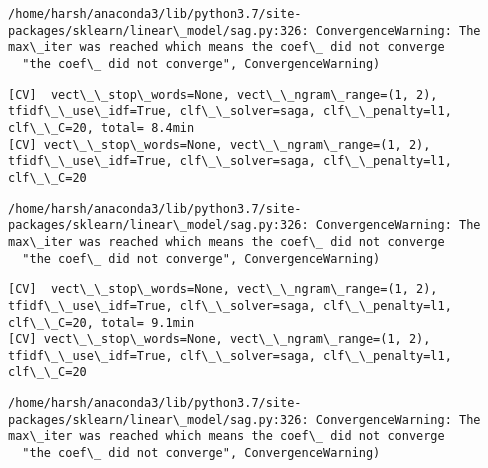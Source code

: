 \documentclass[11pt]{article}
\begin{document}
    \begin{Verbatim}[commandchars=\\\{\}]
/home/harsh/anaconda3/lib/python3.7/site-packages/sklearn/linear\_model/sag.py:326: ConvergenceWarning: The max\_iter was reached which means the coef\_ did not converge
  "the coef\_ did not converge", ConvergenceWarning)

    \end{Verbatim}

    \begin{Verbatim}[commandchars=\\\{\}]
[CV]  vect\_\_stop\_words=None, vect\_\_ngram\_range=(1, 2), tfidf\_\_use\_idf=True, clf\_\_solver=saga, clf\_\_penalty=l1, clf\_\_C=20, total= 8.4min
[CV] vect\_\_stop\_words=None, vect\_\_ngram\_range=(1, 2), tfidf\_\_use\_idf=True, clf\_\_solver=saga, clf\_\_penalty=l1, clf\_\_C=20 

    \end{Verbatim}

    \begin{Verbatim}[commandchars=\\\{\}]
/home/harsh/anaconda3/lib/python3.7/site-packages/sklearn/linear\_model/sag.py:326: ConvergenceWarning: The max\_iter was reached which means the coef\_ did not converge
  "the coef\_ did not converge", ConvergenceWarning)

    \end{Verbatim}

    \begin{Verbatim}[commandchars=\\\{\}]
[CV]  vect\_\_stop\_words=None, vect\_\_ngram\_range=(1, 2), tfidf\_\_use\_idf=True, clf\_\_solver=saga, clf\_\_penalty=l1, clf\_\_C=20, total= 9.1min
[CV] vect\_\_stop\_words=None, vect\_\_ngram\_range=(1, 2), tfidf\_\_use\_idf=True, clf\_\_solver=saga, clf\_\_penalty=l1, clf\_\_C=20 

    \end{Verbatim}

    \begin{Verbatim}[commandchars=\\\{\}]
/home/harsh/anaconda3/lib/python3.7/site-packages/sklearn/linear\_model/sag.py:326: ConvergenceWarning: The max\_iter was reached which means the coef\_ did not converge
  "the coef\_ did not converge", ConvergenceWarning)

    \end{Verbatim}
\end{document}
